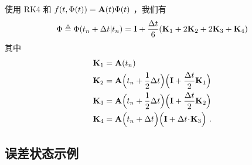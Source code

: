 使用 RK4 和 $f(t,\Phi(t))={\bf A}(t)\Phi(t)$ ，我们有
%
\begin{equation}
\Phi\triangleq\Phi(t_n+\Delta t|t_n) = {\bf I} + \frac{\Delta t}{6}({\bf K}_1+2{\bf K}_2+2{\bf K}_3+{\bf K}_4)
\end{equation}
%
其中
%
%
\begin{align}
{\bf K}_1 &= {\bf A}(t_n) \\
{\bf K}_2 &= {\bf A}\Big(t_n + \frac{1}{2}\Delta t \Big)\Big({\bf I} + \frac{\Delta t}{2} {\bf K}_1 \Big)\\
{\bf K}_3 &= {\bf A}\Big(t_n + \frac{1}{2}\Delta t \Big)\Big( {\bf I} + \frac{\Delta t}{2} {\bf K}_2\Big) \\
{\bf K}_4 &= {\bf A}\Big(t_n + \Delta t \Big)\Big( {\bf I} + \Delta t \!\cdot\! {\bf K}_3\Big) ~.
\end{align}%

\subsection{误差状态示例}


